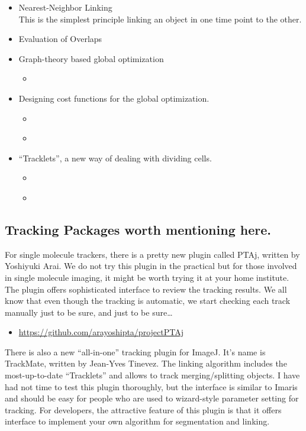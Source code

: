\documentclass[11pnt]{article}
\begin{document}
\begin{itemize}
	\item Nearest-Neighbor Linking\\
	This is the simplest principle linking an object in one time point to the other. 
	\item Evaluation of Overlaps
	\item Graph-theory based global optimization
	\begin{itemize}
		\item \cite{Vallotton2003a}
	\end{itemize}
	\item Designing cost functions for the global optimization. 
	\begin{itemize}
		\item \cite{Sbalzarini2005a}
		\item \cite{Sbalzarini2006a}
	\end{itemize}
	\item ``Tracklets'', a new way of dealing with dividing cells.
	\begin{itemize}
		\item \cite{Jaqaman2009a}
		\item \cite{Bise2011}
	\end{itemize}
\end{itemize}

\subsection{Tracking Packages worth mentioning here.}

For single molecule trackers, there is a pretty new plugin called PTAj, written by Yoshiyuki Arai. We do not try this plugin in the practical but for those involved in single molecule imaging, it might be worth trying it at your home institute. The plugin offers sophisticated interface to review the tracking results. We all know that even though the tracking is automatic, we start checking each track manually just to be sure, and just to be sure\dots

\begin{itemize}
\item \url{https://github.com/arayoshipta/projectPTAj}
\end{itemize}

There is also a new ``all-in-one'' tracking plugin for ImageJ. It's name is TrackMate, written by Jean-Yves Tinevez. The linking algorithm includes the most-up-to-date ``Tracklets'' and allows to track merging/splitting objects. I have had not time to test this plugin thoroughly, but the interface is similar to Imaris and should be easy for people who are used to wizard-style parameter setting for tracking. For developers, the attractive feature of this plugin is that it offers interface to implement your own algorithm for segmentation and linking. 
\end{document}
